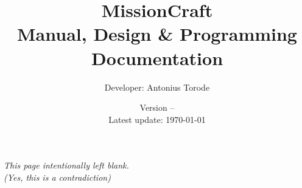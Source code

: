 \documentclass[openany,a4paper,10pt]{book}
\title{MissionCraft \\  Manual, Design \& Programming Documentation}
\author{Developer: Antonius Torode}
\date{Version -- \version \\ Latest update: \today}
\begin{document}
\frontmatter
\maketitle

\tableofcontents
\newpage
\vspace*{\fill}
\begin{center}
	\textit{This page intentionally left blank. \\(Yes, this is a contradiction)}
\end{center}
\vspace*{\fill}

\mainmatter
\pagestyle{fancy}
\fancyhf{}
\fancyhead[RO, LE]{\thepage}












\backmatter
%
%
\printindex
\end{document}
